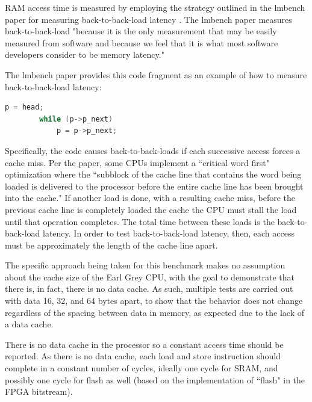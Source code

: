 \documentclass{article}
\begin{document}
RAM access time is measured by employing the strategy outlined in the lmbench paper for measuring back-to-back-load latency \cite{lmbench}. The lmbench paper measures back-to-back-load "because it is the only measurement that may be easily measured from software and because we feel that it is what most software developers consider to be memory latency." \cite{lmbench} 

The lmbench paper provides this code fragment as an example of how to measure back-to-back-load latency:
\begin{lstlisting}[language=c]
        p = head;
        while (p->p_next)
            p = p->p_next;
\end{lstlisting}


Specifically, the code causes back-to-back-loads if each successive access forces a cache miss. Per the paper, some CPUs implement a ``critical word first" optimization where the ``subblock of the cache line that contains the word being loaded is delivered to the processor before the entire cache line has been brought into the cache." \cite{lmbench} If another load is done, with a resulting cache miss, before the previous cache line is completely loaded the cache the CPU must stall the load until that operation completes. The total time between these loads is the back-to-back-load latency. In order to test back-to-back-load latency, then, each access must be approximately the length of the cache line apart.

The specific approach being taken for this benchmark makes no assumption about the cache size of the Earl Grey CPU, with the goal to demonstrate that there is, in fact, there is no data cache. As such, multiple tests are carried out with data 16, 32, and 64 bytes apart, to show that the behavior does not change regardless of the spacing between data in memory, as expected due to the lack of a data cache.

There is no data cache in the processor so a constant access time should be reported. As there is no data cache, each load and store instruction should complete in a constant number of cycles, ideally one cycle for SRAM, and possibly one cycle for flash as well (based on the implementation of ``flash" in the FPGA bitstream).
\end{document}
